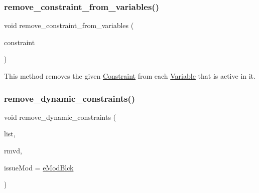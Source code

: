 \subsubsection{\texorpdfstring{remove\+\_\+constraint\+\_\+from\+\_\+variables()}{remove\_constraint\_from\_variables()}}
{\footnotesize\ttfamily void remove\+\_\+constraint\+\_\+from\+\_\+variables (\begin{DoxyParamCaption}\item[{\mbox{\hyperlink{class_s_m_spp__di__unipi__it_1_1_constraint}{Constraint}} $\ast$}]{constraint }\end{DoxyParamCaption})\hspace{0.3cm}{\ttfamily [private]}}

This method removes the given \mbox{\hyperlink{class_s_m_spp__di__unipi__it_1_1_constraint}{Constraint}} from each \mbox{\hyperlink{class_s_m_spp__di__unipi__it_1_1_variable}{Variable}} that is active in it. \mbox{\label{class_s_m_spp__di__unipi__it_1_1_block_a70a454edfce317205e2b0e65823a8322}} 
\subsubsection{\texorpdfstring{remove\+\_\+dynamic\+\_\+constraints()}{remove\_dynamic\_constraints()}\hspace{0.1cm}{\footnotesize\ttfamily [1/2]}}
{\footnotesize\ttfamily void remove\+\_\+dynamic\+\_\+constraints (\begin{DoxyParamCaption}\item[{std\+::list$<$ Const $>$ \&}]{list,  }\item[{std\+::vector$<$ typename std\+::list$<$ Const $>$\+::const\+\_\+iterator $>$ \&}]{rmvd,  }\item[{\mbox{\hyperlink{group___modification___t_y_p_e_s_ga544246d8c462e9a2d817c2c30797968f}{c\+\_\+\+Mod\+Param}}}]{issue\+Mod = {\ttfamily \mbox{\hyperlink{group___modification___t_y_p_e_s_gga48fddcdd03a03f49b7e389ca1ed938d4a21b14b26b1c0093a0905f6fc010bad29}{e\+Mod\+Blck}}} }\end{DoxyParamCaption})}



